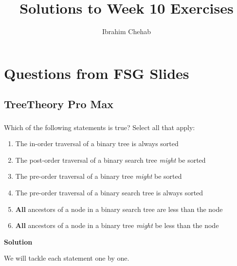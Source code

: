\documentclass[12pt]{article}
\title{Solutions to Week 10 Exercises}
\author{Ibrahim Chehab}
\begin{document}
\maketitle

\section{Questions from FSG Slides}
\subsection{TreeTheory Pro Max}
\subsubsection{}
Which of the following statements is true? Select all that apply:  
\begin{enumerate}
    \item The in-order traversal of a binary tree is always sorted
    \item The post-order traversal of a binary search tree \textit{might} be sorted
    \item The pre-order traversal of a binary tree \textit{might} be sorted
    \item The pre-order traversal of a binary search tree is always sorted
    \item \textbf{All} ancestors of a node in a binary search tree are less than the node
    \item \textbf{All} ancestors of a node in a binary tree \textit{might} be less than the node
\end{enumerate}

\textbf{Solution}

We will tackle each statement one by one.
\end{document}
